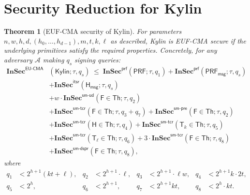\documentclass[11pt,a4paper]{article}
\newtheorem{theorem}{Theorem}[section]
\newcommand{\F}{\mathsf{F}}
\newcommand{\Hfunc}{\mathsf{H}}
\newcommand{\Th}{\mathsf{Th}}
\newcommand{\T}{\mathsf{T}}
\newcommand{\PRF}{\mathsf{PRF}}
\newcommand{\PRFmsg}{\mathsf{PRF}_{\mathsf{msg}}}
\newcommand{\Hmsg}{\mathsf{H}_{\mathsf{msg}}}
\newcommand{\InSec}[1]{\mathbf{InSec}^{\mathsf{#1}}}
\begin{document}
\section{Security Reduction for Kylin}
\label{sec:kylin-proof}

\begin{theorem}[EUF-CMA security of Kylin]
\label{thm:kylin}
For parameters $n,w,h,d,(h_0,\ldots,h_{d-1}),m,t,k,\ell$ as described, Kylin is EUF-CMA secure if the underlying primitives satisfy the required properties. Concretely, for any adversary $\mathcal{A}$ making $q_s$ signing queries:
\begin{align}
\InSec{EU\text{-}CMA}&(\mathsf{Kylin}; \tau, q_s) \;\le\;
\InSec{prf}(\PRF; \tau, q_1)
+ \InSec{prf}(\PRFmsg; \tau, q_s) \nonumber\\
&+ \InSec{itsr}(\Hmsg; \tau, q_s) \nonumber\\
&+ w \cdot \InSec{sm\text{-}ud}(\F \in \boldsymbol{\Th}; \tau, q_2) \nonumber\\
&+ \InSec{sm\text{-}tcr}(\F \in \boldsymbol{\Th}; \tau, q_3 + q_7)
+ \InSec{sm\text{-}pre}(\F \in \boldsymbol{\Th}; \tau, q_2) \nonumber\\
&+ \InSec{sm\text{-}tcr}(\Hfunc \in \boldsymbol{\Th}; \tau, q_4)
+ \InSec{sm\text{-}tcr}(\T_k \in \boldsymbol{\Th}; \tau, q_5) \nonumber\\
&+ \InSec{sm\text{-}tcr}(\T_\ell \in \boldsymbol{\Th}; \tau, q_6)
+ 3 \cdot \InSec{sm\text{-}tcr}(\F \in \boldsymbol{\Th}; \tau, q_8) \nonumber\\
&+ \InSec{sm\text{-}dspr}(\F \in \boldsymbol{\Th}; \tau, q_8),
\label{eq:kylin-bound}
\end{align}
where
\begin{align*}
q_1 &< 2^{h+1}(kt + \ell), &
q_2 &< 2^{h+1} \cdot \ell, &
q_3 &< 2^{h+1} \cdot \ell w, &
q_4 &< 2^{h+1}k \cdot 2t, \\
q_5 &< 2^h, &
q_6 &< 2^{h+1}, &
q_7 &< 2^{h+1}kt, &
q_8 &< 2^h \cdot kt.
\end{align*}
\end{theorem}
\end{document}
